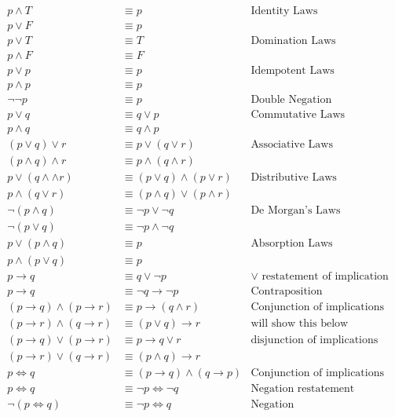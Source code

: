 \begin{exmp}
\begin{align}
p \land T &\equiv p  & \text{Identity Laws}\\
p \lor F &\equiv p  & \\
p \lor T & \equiv T & \text{Domination Laws}\\
p \land F & \equiv F & \\
p \lor p & \equiv p & \text{Idempotent Laws}\\
p \land p & \equiv p & \\
\lnot \lnot p & \equiv p & \text{Double Negation}\\
p \lor q & \equiv q \lor p & \text{Commutative Laws}\\
p \land q & \equiv q \land p & \\
(p \lor q) \lor r & \equiv p \lor (q \lor r) & \text{Associative Laws}\\
(p \land q) \land r & \equiv p \land (q \land r) \\
p \lor (q\land\land r) & \equiv (p \lor q ) \land 
 (p \lor r)  & \text{Distributive Laws}\\
p \land (q\lor r) & \equiv (p \land q) \lor (p \land r) & \\
\lnot (p\land q) & \equiv \lnot p \lor \lnot q & \text{De Morgan's Laws}\\
\lnot (p\lor q) & \equiv \lnot p \land \lnot q & \\
p \lor (p \land q) & \equiv p & \text{Absorption Laws}\\
p \land (p \lor q)& \equiv p &\\
p \to q & \equiv q \lor \lnot p   & \text{$\lor$ restatement of implication}\\
p \to q & \equiv \lnot q \to \lnot p & \text{Contraposition}\\
(p \to q) \land (p \to r) &\equiv p\to (q \land r)& \text{Conjunction of implications}\\
(p \to r) \land (q \to r) &\equiv (p \lor q) \to r & \text{will show this below}  \\ 
(p \to q) \lor (p \to r) &\equiv p\to q \lor r& \text{disjunction of implications}\\
(p \to r) \lor (q \to r) &\equiv (p\land q)\to r\\
p \iff q & \equiv (p\to q)\land(q\to p)  & \text{Conjunction of implications}\\
p \iff q & \equiv \lnot p \iff \lnot q  & \text{Negation restatement}\\
\lnot(p \iff q) & \equiv \lnot p \iff q  & \text{Negation}
\end{align}
\end{exmp}


